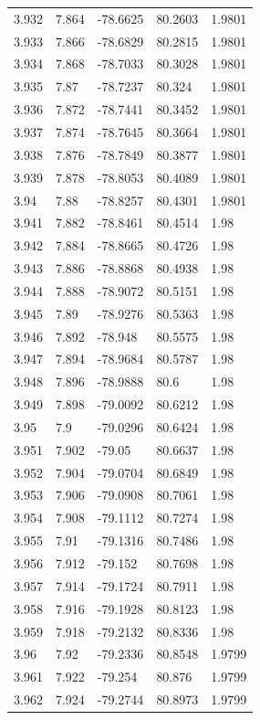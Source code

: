 \begin{tabular}{lllll}
3.932 & 7.864 & -78.6625 & 80.2603 & 1.9801 \\
3.933 & 7.866 & -78.6829 & 80.2815 & 1.9801 \\
3.934 & 7.868 & -78.7033 & 80.3028 & 1.9801 \\
3.935 & 7.87 & -78.7237 & 80.324 & 1.9801 \\
3.936 & 7.872 & -78.7441 & 80.3452 & 1.9801 \\
3.937 & 7.874 & -78.7645 & 80.3664 & 1.9801 \\
3.938 & 7.876 & -78.7849 & 80.3877 & 1.9801 \\
3.939 & 7.878 & -78.8053 & 80.4089 & 1.9801 \\
3.94 & 7.88 & -78.8257 & 80.4301 & 1.9801 \\
3.941 & 7.882 & -78.8461 & 80.4514 & 1.98 \\
3.942 & 7.884 & -78.8665 & 80.4726 & 1.98 \\
3.943 & 7.886 & -78.8868 & 80.4938 & 1.98 \\
3.944 & 7.888 & -78.9072 & 80.5151 & 1.98 \\
3.945 & 7.89 & -78.9276 & 80.5363 & 1.98 \\
3.946 & 7.892 & -78.948 & 80.5575 & 1.98 \\
3.947 & 7.894 & -78.9684 & 80.5787 & 1.98 \\
3.948 & 7.896 & -78.9888 & 80.6 & 1.98 \\
3.949 & 7.898 & -79.0092 & 80.6212 & 1.98 \\
3.95 & 7.9 & -79.0296 & 80.6424 & 1.98 \\
3.951 & 7.902 & -79.05 & 80.6637 & 1.98 \\
3.952 & 7.904 & -79.0704 & 80.6849 & 1.98 \\
3.953 & 7.906 & -79.0908 & 80.7061 & 1.98 \\
3.954 & 7.908 & -79.1112 & 80.7274 & 1.98 \\
3.955 & 7.91 & -79.1316 & 80.7486 & 1.98 \\
3.956 & 7.912 & -79.152 & 80.7698 & 1.98 \\
3.957 & 7.914 & -79.1724 & 80.7911 & 1.98 \\
3.958 & 7.916 & -79.1928 & 80.8123 & 1.98 \\
3.959 & 7.918 & -79.2132 & 80.8336 & 1.98 \\
3.96 & 7.92 & -79.2336 & 80.8548 & 1.9799 \\
3.961 & 7.922 & -79.254 & 80.876 & 1.9799 \\
3.962 & 7.924 & -79.2744 & 80.8973 & 1.9799 \\

\end{tabular}
